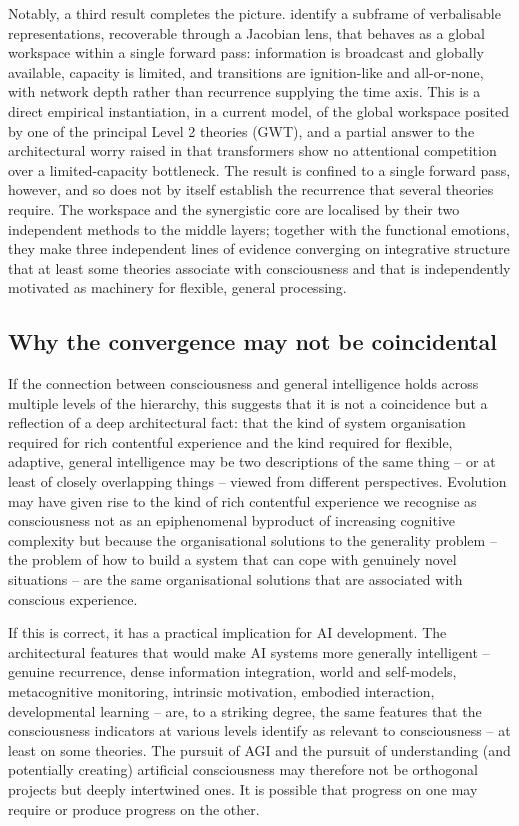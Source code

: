 \documentclass[11pt, a4paper, onecolumn, gdm]{google}
\newcounter{none}
\begin{document}
Notably, a third result completes the picture.
\citet{gurnee2026} identify a subframe of verbalisable representations, recoverable through a Jacobian lens, that behaves as a global workspace within a single forward pass: information is broadcast and globally available, capacity is limited, and transitions are ignition-like and all-or-none, with network depth rather than recurrence supplying the time axis.
This is a direct empirical instantiation, in a current model, of the global workspace posited by one of the principal Level 2 theories (GWT), and a partial answer to the architectural worry raised in  that transformers show no attentional competition over a limited-capacity bottleneck.
The result is confined to a single forward pass, however, and so does not by itself establish the recurrence that several theories require.
The workspace and the synergistic core are localised by their two independent methods to the middle layers; together with the functional emotions, they make three independent lines of evidence converging on integrative structure that at least some theories associate with consciousness and that is independently motivated as machinery for flexible, general processing.

\subsection{Why the convergence may not be coincidental}\label{why-the-convergence-may-not-be-coincidental}

If the connection between consciousness and general intelligence holds across multiple levels of the hierarchy, this suggests that it is not a coincidence but a reflection of a deep architectural fact: that the kind of system organisation required for rich contentful experience and the kind required for flexible, adaptive, general intelligence may be two descriptions of the same thing -- or at least of closely overlapping things -- viewed from different perspectives.
Evolution may have given rise to the kind of rich contentful experience we recognise as consciousness not as an epiphenomenal byproduct of increasing cognitive complexity but because the organisational solutions to the generality problem -- the problem of how to build a system that can cope with genuinely novel situations -- are the same organisational solutions that are associated with conscious experience.

If this is correct, it has a practical implication for AI development.
The architectural features that would make AI systems more generally intelligent -- genuine recurrence, dense information integration, world and self-models, metacognitive monitoring, intrinsic motivation, embodied interaction, developmental learning -- are, to a striking degree, the same features that the consciousness indicators at various levels identify as relevant to consciousness -- at least on some theories.
The pursuit of AGI and the pursuit of understanding (and potentially creating) artificial consciousness may therefore not be orthogonal projects but deeply intertwined ones.
It is possible that progress on one may require or produce progress on the other.
\end{document}
